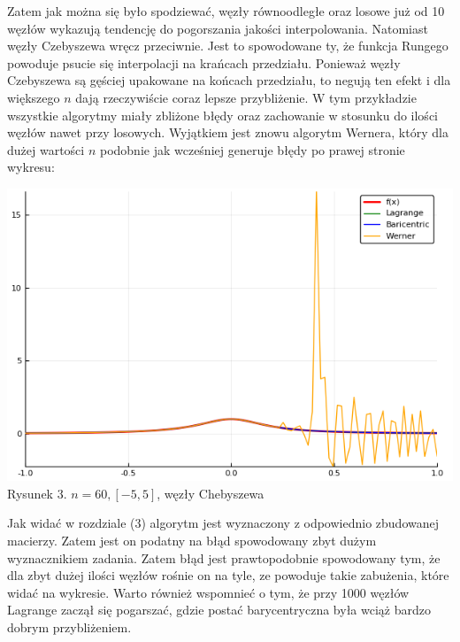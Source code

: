 \documentclass[11pt, wide]{article}
\begin{document}
Zatem jak można się było spodziewać, węzły równoodległe oraz losowe już od 10 węzłów wykazują
tendencję do pogorszania jakości interpolowania. Natomiast węzły Czebyszewa wręcz przeciwnie. 
Jest to spowodowane ty, że funkcja Rungego powoduje psucie się interpolacji na krańcach przedziału. 
Ponieważ węzły Czebyszewa są gęściej upakowane na końcach przedziału, to negują ten efekt i dla większego $n$ dają rzeczywiście
coraz lepsze przybliżenie. W tym przykładzie wszystkie algorytmy
miały zbliżone błędy oraz zachowanie w stosunku do ilości węzłów nawet przy losowych. Wyjątkiem jest znowu algorytm Wernera,
który dla dużej wartości $n$ podobnie jak wcześniej generuje błędy po prawej stronie wykresu:
\begin{center}
    \includegraphics[scale=0.4]{wykres3}\\
    Rysunek 3. $n = 60, [-5,5]$, węzły Chebyszewa
\end{center}
Jak widać w rozdziale (3) algorytm jest wyznaczony
z odpowiednio zbudowanej macierzy. Zatem jest on podatny na błąd spowodowany zbyt dużym 
wyznacznikiem zadania. Zatem błąd jest prawtopodobnie spowodowany tym, że dla zbyt dużej ilości
węzłów rośnie on na tyle, ze powoduje takie zabużenia, które widać na wykresie. Warto również
wspomnieć o tym, że przy 1000 węzłów Lagrange zaczął się pogarszać, gdzie postać barycentryczna
była wciąż bardzo dobrym przybliżeniem.
\end{document}
